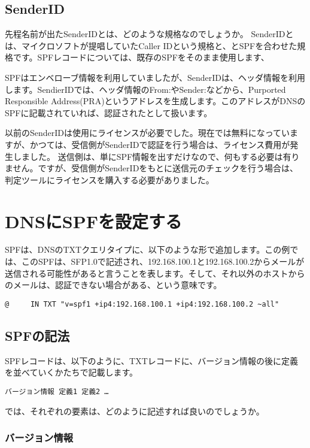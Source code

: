 \subsection{SenderID}

先程名前が出たSenderIDとは、どのような規格なのでしょうか。
SenderIDとは、マイクロソフトが提唱していたCaller IDという規格と、とSPFを合わせた規格です。SPFレコードについては、既存のSPFをそのまま使用します、

SPFはエンベローブ情報を利用していましたが、SenderIDは、ヘッダ情報を利用します。SendierIDでは、ヘッダ情報のFrom:やSender:などから、Purported Responsible Address(PRA)というアドレスを生成します。このアドレスがDNSのSPFに記載されていれば、認証されたとして扱います。

以前のSenderIDは使用にライセンスが必要でした。現在では無料になっていますが、かつては、受信側がSenderIDで認証を行う場合は、ライセンス費用が発生しました。
送信側は、単にSPF情報を出すだけなので、何もする必要は有りません。ですが、受信側がSenderIDをもとに送信元のチェックを行う場合は、判定ツールにライセンスを購入する必要がありました。

\section{DNSにSPFを設定する}

SPFは、DNSのTXTクエリタイプに、以下のような形で追加します。この例では、このSPFは、SFP1.0で記述され、192.168.100.1と192.168.100.2からメールが送信される可能性があると言うことを表します。そして、それ以外のホストからのメールは、認証できない場合がある、という意味です。

\begin{verbatim}
@     IN TXT "v=spf1 +ip4:192.168.100.1 +ip4:192.168.100.2 ~all"
\end{verbatim}

\subsection{SPFの記法}

SPFレコードは、以下のように、TXTレコードに、バージョン情報の後に定義を並べていくかたちで記載します。

\begin{verbatim}
バージョン情報 定義1 定義2 …
\end{verbatim}

では、それぞれの要素は、どのように記述すれば良いのでしょうか。

\subsubsection{バージョン情報}


